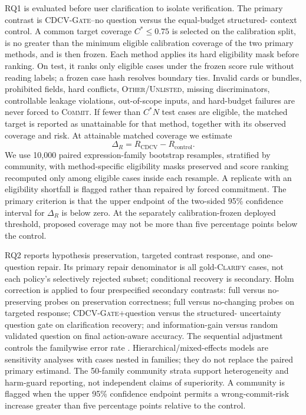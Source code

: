 \documentclass[preprint,12pt,authoryear]{elsarticle}
\newcommand{\cdcv}{\textsc{CDCV-Gate}}
\newcommand{\commit}{\ifmmode\operatorname{COMMIT}\else\textsc{Commit}\fi}
\newcommand{\clarify}{\ifmmode\operatorname{CLARIFY}\else\textsc{Clarify}\fi}
\begin{document}
RQ1 is evaluated before user clarification to isolate verification. The
primary contrast is \cdcv{}--no question versus the equal-budget structured-
context control. A common target coverage $C^*\leq0.75$ is selected on the
calibration split, is no greater than the minimum eligible calibration
coverage of the two primary methods, and is then frozen. Each method applies
its hard eligibility mask before ranking. On test, it ranks only eligible
cases under the frozen score rule without reading labels; a frozen case hash
resolves boundary ties. Invalid cards or bundles, prohibited fields, hard
conflicts, \textsc{Other/Unlisted}, missing discriminators, controllable
leakage violations, out-of-scope inputs, and hard-budget failures are never
forced to \commit. If fewer than $C^*N$ test cases are eligible, the matched
target is reported as unattainable for that method, together with its observed
coverage and risk. At attainable matched coverage we estimate
\begin{equation}
\Delta_R=R_{\mathrm{CDCV}}-R_{\mathrm{control}}.
\end{equation}
We use 10,000 paired expression-family bootstrap resamples, stratified by
community, with method-specific eligibility masks preserved and score ranking
recomputed only among eligible cases inside each resample. A replicate with an
eligibility shortfall is flagged rather than repaired by forced commitment.
The primary criterion is that the upper endpoint of the two-sided
95\% confidence interval for $\Delta_R$ is below zero. At the separately
calibration-frozen deployed threshold, proposed coverage may not be more than
five percentage points below the control.

RQ2 reports hypothesis preservation, targeted contrast response, and
one-question repair. Its primary repair denominator is all gold-\clarify{}
cases, not each policy's selectively rejected subset; conditional recovery is
secondary. Holm
correction is applied to four prespecified secondary contrasts: full versus
no-preserving probes on preservation correctness; full versus no-changing
probes on targeted response; \cdcv{}+question versus the structured-
uncertainty question gate on clarification recovery; and information-gain
versus random validated question on final action-aware accuracy.
The sequential adjustment controls the familywise error rate
\citep{holm1979simple}.
Hierarchical/mixed-effects models are sensitivity analyses with
cases nested in families; they do not replace the paired primary estimand.
The 50-family community strata support heterogeneity and harm-guard reporting,
not independent claims of superiority. A community is flagged when the upper
95\% confidence endpoint permits a wrong-commit-risk increase greater than
five percentage points relative to the control.
\end{document}
